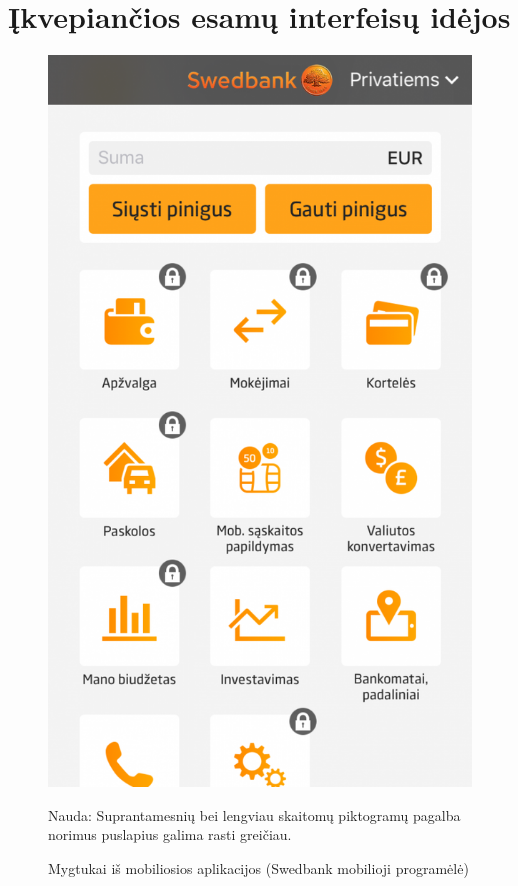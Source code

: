 \documentclass{VUMIFPSkursinis}
\begin{document}
\section{Įkvepiančios esamų interfeisų idėjos}
\begin{figure}[!htb]
	\begin{center}
	\includegraphics[scale=0.4]{mobileApp.png}
	\end{center}
  \caption{Mygtukai iš mobiliosios aplikacijos (Swedbank mobilioji programėlė)}
	\label{fig:mobileApp}
	Nauda: Suprantamesnių bei lengviau skaitomų piktogramų pagalba norimus puslapius galima rasti greičiau.
\end{figure}
\end{document}
